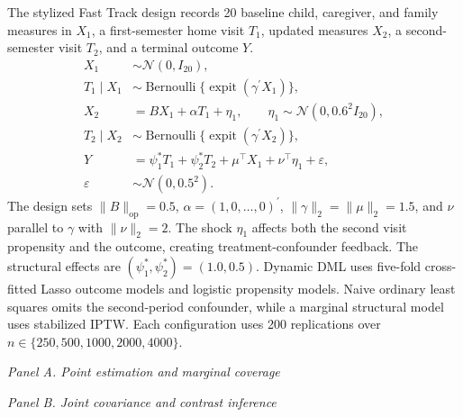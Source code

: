 The stylized Fast Track design records 20 baseline child, caregiver, and family measures in $X_1$, a first-semester home visit $T_1$, updated measures $X_2$, a second-semester visit $T_2$, and a terminal outcome $Y$.
\begin{align}
X_1&\sim\mathcal N(0,I_{20}),\nonumber\\
T_1\mid X_1&\sim\operatorname{Bernoulli}
\{\operatorname{expit}(\gamma^\prime X_1)\},\nonumber\\
X_2&=BX_1+\alpha T_1+\eta_1,
\qquad \eta_1\sim\mathcal N(0,0.6^2I_{20}),\nonumber\\
T_2\mid X_2&\sim\operatorname{Bernoulli}
\{\operatorname{expit}(\gamma^\prime X_2)\},\nonumber\\
Y&=\psi_1^*T_1+\psi_2^*T_2+\mu^\top X_1+\nu^\top\eta_1+\varepsilon,\nonumber\\
\varepsilon&\sim\mathcal N(0,0.5^2).
\label{eq:simB1_dgp}
\end{align}
The design sets $\|B\|_{\mathrm{op}}=0.5$, $\alpha=(1,0,\ldots,0)^\prime$, $\|\gamma\|_2=\|\mu\|_2=1.5$, and $\nu$ parallel to $\gamma$ with $\|\nu\|_2=2$. The shock $\eta_1$ affects both the second visit propensity and the outcome, creating treatment-confounder feedback. The structural effects are $(\psi_1^*,\psi_2^*)=(1.0,0.5)$. Dynamic DML uses five-fold cross-fitted Lasso outcome models and logistic propensity models. Naive ordinary least squares omits the second-period confounder, while a marginal structural model uses stabilized IPTW. Each configuration uses 200 replications over $n\in\{250,500,1000,2000,4000\}$.

\begin{table}[htbp]
\centering
\caption{Dynamic-DML results for the stylized home-visiting SNMM at $n=4000$ over 200 datasets. Panel A reports bias, RMSE, and 95\% interval coverage. Panel B compares the joint sandwich covariance with its Monte Carlo target, and sets the standard error for $\psi_1-\psi_2$ against the one obtained by dropping the cross-stage block.}
\label{tab:simB1}
\begin{minipage}{\textwidth}
\centering
\emph{Panel A. Point estimation and marginal coverage}\par\smallskip

\par\medskip
\emph{Panel B. Joint covariance and contrast inference}\par\smallskip

\end{minipage}
\end{table}

